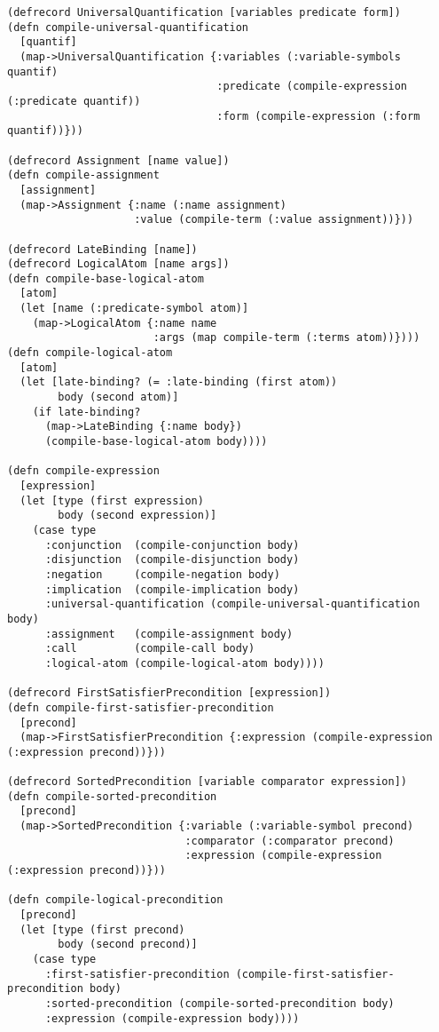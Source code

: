 \begin{lstlisting}
(defrecord UniversalQuantification [variables predicate form])
(defn compile-universal-quantification
  [quantif]
  (map->UniversalQuantification {:variables (:variable-symbols quantif)
                                 :predicate (compile-expression (:predicate quantif))
                                 :form (compile-expression (:form quantif))}))

(defrecord Assignment [name value])
(defn compile-assignment
  [assignment]
  (map->Assignment {:name (:name assignment)
                    :value (compile-term (:value assignment))}))

(defrecord LateBinding [name])
(defrecord LogicalAtom [name args])
(defn compile-base-logical-atom
  [atom]
  (let [name (:predicate-symbol atom)]
    (map->LogicalAtom {:name name
                       :args (map compile-term (:terms atom))})))
(defn compile-logical-atom
  [atom]
  (let [late-binding? (= :late-binding (first atom))
        body (second atom)]
    (if late-binding?
      (map->LateBinding {:name body})
      (compile-base-logical-atom body))))

(defn compile-expression
  [expression]
  (let [type (first expression)
        body (second expression)]
    (case type
      :conjunction  (compile-conjunction body)
      :disjunction  (compile-disjunction body)
      :negation     (compile-negation body)
      :implication  (compile-implication body)
      :universal-quantification (compile-universal-quantification body)
      :assignment   (compile-assignment body)
      :call         (compile-call body)
      :logical-atom (compile-logical-atom body))))

(defrecord FirstSatisfierPrecondition [expression])
(defn compile-first-satisfier-precondition
  [precond]
  (map->FirstSatisfierPrecondition {:expression (compile-expression (:expression precond))}))

(defrecord SortedPrecondition [variable comparator expression])
(defn compile-sorted-precondition
  [precond]
  (map->SortedPrecondition {:variable (:variable-symbol precond)
                            :comparator (:comparator precond)
                            :expression (compile-expression (:expression precond))}))

(defn compile-logical-precondition
  [precond]
  (let [type (first precond)
        body (second precond)]
    (case type
      :first-satisfier-precondition (compile-first-satisfier-precondition body)
      :sorted-precondition (compile-sorted-precondition body)
      :expression (compile-expression body))))


\end{lstlisting}
